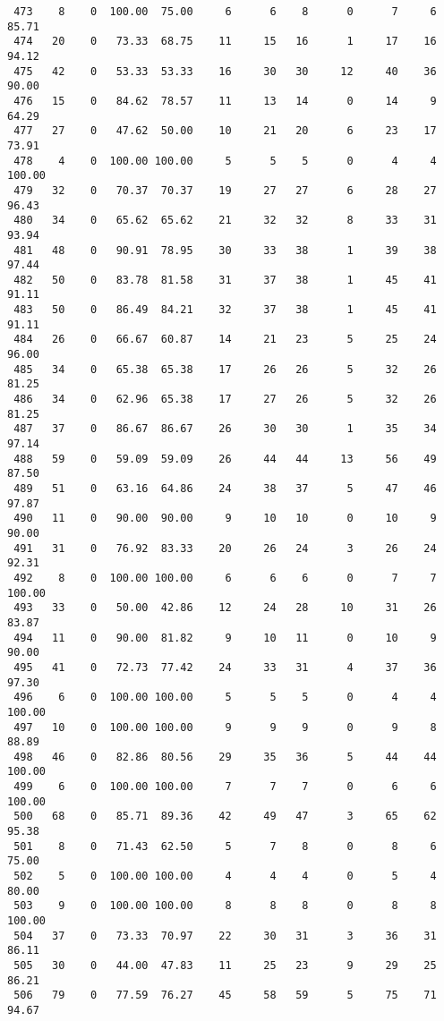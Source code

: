 \begin{verbatim}
 473    8    0  100.00  75.00     6      6    8      0      7     6    85.71
 474   20    0   73.33  68.75    11     15   16      1     17    16    94.12
 475   42    0   53.33  53.33    16     30   30     12     40    36    90.00
 476   15    0   84.62  78.57    11     13   14      0     14     9    64.29
 477   27    0   47.62  50.00    10     21   20      6     23    17    73.91
 478    4    0  100.00 100.00     5      5    5      0      4     4   100.00
 479   32    0   70.37  70.37    19     27   27      6     28    27    96.43
 480   34    0   65.62  65.62    21     32   32      8     33    31    93.94
 481   48    0   90.91  78.95    30     33   38      1     39    38    97.44
 482   50    0   83.78  81.58    31     37   38      1     45    41    91.11
 483   50    0   86.49  84.21    32     37   38      1     45    41    91.11
 484   26    0   66.67  60.87    14     21   23      5     25    24    96.00
 485   34    0   65.38  65.38    17     26   26      5     32    26    81.25
 486   34    0   62.96  65.38    17     27   26      5     32    26    81.25
 487   37    0   86.67  86.67    26     30   30      1     35    34    97.14
 488   59    0   59.09  59.09    26     44   44     13     56    49    87.50
 489   51    0   63.16  64.86    24     38   37      5     47    46    97.87
 490   11    0   90.00  90.00     9     10   10      0     10     9    90.00
 491   31    0   76.92  83.33    20     26   24      3     26    24    92.31
 492    8    0  100.00 100.00     6      6    6      0      7     7   100.00
 493   33    0   50.00  42.86    12     24   28     10     31    26    83.87
 494   11    0   90.00  81.82     9     10   11      0     10     9    90.00
 495   41    0   72.73  77.42    24     33   31      4     37    36    97.30
 496    6    0  100.00 100.00     5      5    5      0      4     4   100.00
 497   10    0  100.00 100.00     9      9    9      0      9     8    88.89
 498   46    0   82.86  80.56    29     35   36      5     44    44   100.00
 499    6    0  100.00 100.00     7      7    7      0      6     6   100.00
 500   68    0   85.71  89.36    42     49   47      3     65    62    95.38
 501    8    0   71.43  62.50     5      7    8      0      8     6    75.00
 502    5    0  100.00 100.00     4      4    4      0      5     4    80.00
 503    9    0  100.00 100.00     8      8    8      0      8     8   100.00
 504   37    0   73.33  70.97    22     30   31      3     36    31    86.11
 505   30    0   44.00  47.83    11     25   23      9     29    25    86.21
 506   79    0   77.59  76.27    45     58   59      5     75    71    94.67

\end{verbatim}
